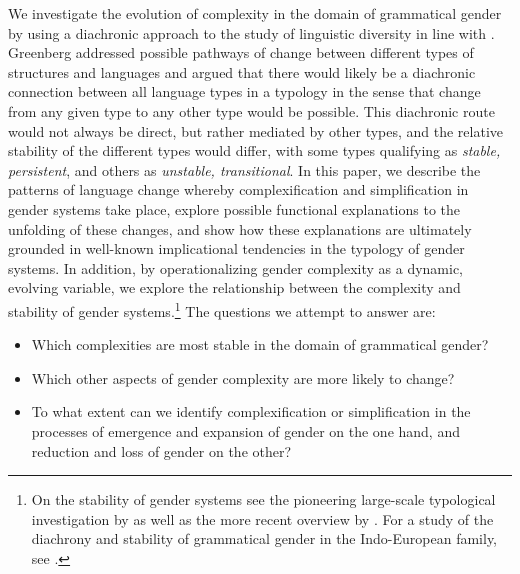 \documentclass[output=collectionpaper]{langsci/langscibook}
\begin{document}
We investigate the evolution of complexity in the domain of grammatical gender by using a diachronic approach to the study of linguistic diversity in line with \citet{Greenberg1978a}. Greenberg addressed possible pathways of change between different types of structures and languages and argued that there would likely be a diachronic connection between all language types in a typology in the sense that change from any given type to any other type would be possible. This diachronic route would not always be direct, but rather mediated by other types, and the relative stability of the different types would differ, with some types qualifying as \textit{stable, persistent}, and others as \textit{unstable, transitional}. In this paper, we describe the patterns of language change whereby complexification and simplification in gender systems take place, explore possible functional explanations to the unfolding of these changes, and show how these explanations are ultimately grounded in well-known implicational tendencies in the typology of gender systems. In addition, by operationalizing gender complexity as a dynamic, evolving variable, we explore the relationship between the complexity and stability of gender systems.\footnote{On the stability of gender systems see the pioneering large-scale typological investigation by \citealt{Nichols1992} as well as the more recent overview by \citealt{Nichols2003}. For a study of the diachrony and stability of grammatical gender in the Indo-European family, see \citet{Matasovic2004}.} The questions we attempt to answer are:
\begin{itemize}
\item Which complexities are most stable in the domain of grammatical gender?
\item Which other aspects of gender complexity are more likely to change?
\item To what extent can we identify complexification or simplification in the processes of emergence and expansion of gender on the one hand, and reduction and loss of gender on the other?
\end{itemize}
\end{document}
